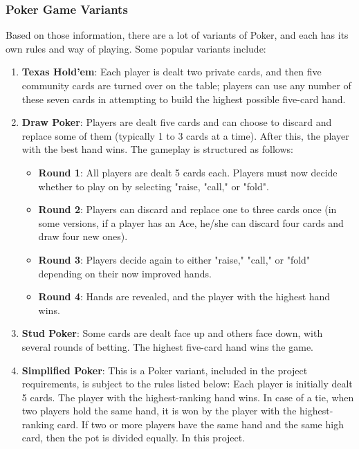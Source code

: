 \subsubsection{Poker Game Variants}
\label{subsubsec:poker-game-variants}

\hspace{1cm} Based on those information, there are a lot of variants of Poker, and each has its own rules and way of playing. Some popular variants include:
\begin{enumerate}
    \item \textbf{Texas Hold'em}: Each player is dealt two private cards, and then five community cards are turned over on the table; players can use any number of these seven cards in attempting to build the highest possible five-card hand.
    \item \textbf{Draw Poker}: Players are dealt five cards and can choose to discard and replace some of them (typically 1 to 3 cards at a time). After this, the player with the best hand wins. The gameplay is structured as follows:
    \begin{itemize}
        \item \textbf{Round 1}: All players are dealt 5 cards each. Players must now decide whether to play on by selecting "raise, "call," or "fold".
        \item \textbf{Round 2}: Players can discard and replace one to three cards once (in some versions, if a player has an Ace, he/she can discard four cards and draw four new ones).
        \item \textbf{Round 3}: Players decide again to either "raise," "call," or "fold" depending on their now improved hands.
        \item \textbf{Round 4}: Hands are revealed, and the player with the highest hand wins.
    \end{itemize}
    \item \textbf{Stud Poker}: Some cards are dealt face up and others face down, with several rounds of betting. The highest five-card hand wins the game.
    \item \textbf{Simplified Poker}: This is a Poker variant, included in the project requirements, is subject to the rules listed below: Each player is initially dealt 5 cards. The player with the highest-ranking hand wins. In case of a tie, when two players hold the same hand, it is won by the player with the highest-ranking card. If two or more players have the same hand and the same high card, then the pot is divided equally. In this project.
\end{enumerate}

